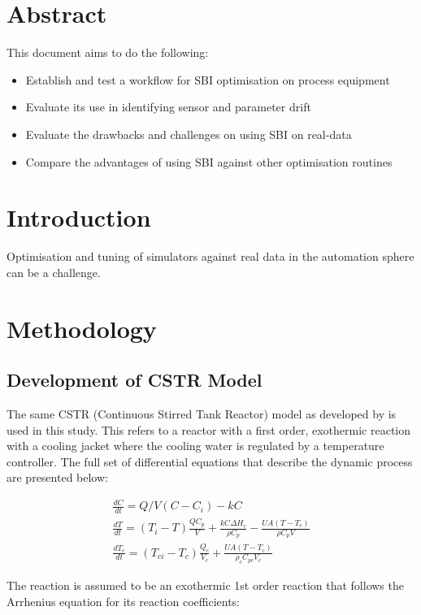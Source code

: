\documentclass{article}
\begin{document}
	
\section{Abstract}

This document aims to do the following:
\begin{itemize}
	\item Establish and test a workflow for SBI optimisation on process equipment
	\item Evaluate its use in identifying sensor and parameter drift
	\item Evaluate the drawbacks and challenges on using SBI on real-data
	\item Compare the advantages of using SBI against other optimisation routines
\end{itemize}

\section{Introduction}

Optimisation and tuning of simulators against real data in the automation sphere can be a challenge. 

\section{Methodology}

\subsection{Development of CSTR Model}
\label{sec:cstr-model}

The same CSTR (Continuous Stirred Tank Reactor) model as developed by \cite{pilario2018canonical} is used in this study. This refers to a reactor with a first order, exothermic reaction with a cooling jacket where the cooling water is regulated by a temperature controller. The full set of differential equations that describe the dynamic process are presented below:

\begin{align}
	\frac{dC}{dt} = Q/V(C-C_i)-kC \\
	\frac{dT}{dt} = (T_i-T)\frac{Q C_p}{V}+\frac{kC\Delta H_{r}}{\rho C_p}-\frac{UA(T-T_c)}{\rho C_p V}\\
	\frac{dT_c}{dt} = (T_{ci}-T_{c})\frac{Q_c}{V_c} +\frac{UA(T-T_c)}{\rho_c C_{pc} V_c	} 
\end{align} 

The reaction is assumed to be an exothermic 1st order reaction that follows the Arrhenius equation for its reaction coefficients:
\end{document}
